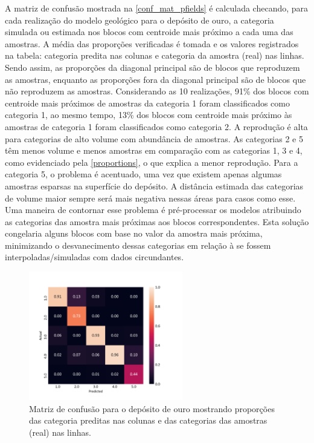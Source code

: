 A matriz de confusão mostrada na \autoref{conf_mat_pfields} é calculada checando, para cada realização do modelo geológico para o depósito de ouro, a categoria simulada ou estimada nos blocos com centroide mais próximo a cada uma das amostras. A média das proporções verificadas é tomada e os valores registrados na tabela: categoria predita nas colunas e categoria da amostra (real) nas linhas. Sendo assim, as proporções da diagonal principal são de blocos que reproduzem as amostras, enquanto as proporções fora da diagonal principal são de blocos que não reproduzem as amostras. Considerando as 10 realizações, 91\% dos blocos com centroide mais próximos de amostras da categoria 1 foram classificados como categoria 1, ao mesmo tempo, 13\% dos blocos com centroide mais próximo às amostras de categoria 1 foram classificados como categoria 2. A reprodução é alta para categorias de alto volume com abundância de amostras. As categorias 2 e 5 têm menos volume e menos amostras em comparação com as categorias 1, 3 e 4, como evidenciado pela \autoref{proportions}, o que explica a menor reprodução. Para a categoria 5, o problema é acentuado, uma vez que existem apenas algumas amostras esparsas na superfície do depósito. A distância estimada das categorias de volume maior sempre será mais negativa nessas áreas para casos como esse. Uma maneira de contornar esse problema é pré-processar os modelos atribuindo as categorias das amostra mais próximas aos blocos correspondentes. Esta solução congelaria alguns blocos com base no valor da amostra mais próxima, minimizando o desvanecimento dessas categorias em relação à se fossem interpoladas/simuladas com dados circundantes.

\begin{figure}[H]
	\caption{\label{conf_mat_pfields} Matriz de confusão para o depósito de ouro mostrando proporções das categoria preditas nas colunas e das categorias das amostras (real) nas linhas.}
	\centering
		\includegraphics[width=0.6\textwidth]{capitulo_3/imagens/backflag.png}
\end{figure}

